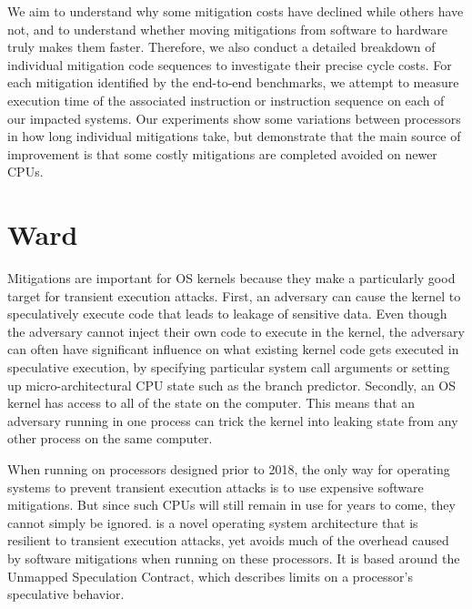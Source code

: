 We aim to understand why some mitigation costs have declined while others have not, and to understand whether moving mitigations from software to hardware truly makes them faster.
Therefore, we also conduct a detailed breakdown of individual mitigation code sequences to investigate their precise cycle costs.
For each mitigation identified by the end-to-end benchmarks, we attempt to measure execution time of the associated instruction or instruction sequence on each of our impacted systems.
Our experiments show some variations between processors in how long individual mitigations take, but demonstrate that the main source of improvement is that some costly mitigations are completed avoided on newer CPUs. 

\section{Ward}
Mitigations are important for OS kernels because they make a particularly good target for transient execution attacks.
First, an adversary can cause the kernel to speculatively execute code that
leads to leakage of sensitive data. Even though the adversary cannot
inject their own code to execute in the kernel, the adversary can often
have significant influence on what existing kernel code gets executed in
speculative execution, by specifying particular system call arguments or
setting up micro-architectural CPU state such as the branch predictor.
Secondly, an OS kernel has access to all of the state
on the computer. This means that an adversary running in one process
can trick the kernel into leaking state from any other process on the
same computer.

When running on processors designed prior to 2018, the only way for operating systems to prevent transient execution attacks is to use expensive software mitigations.
But since such CPUs will still remain in use for years to come, they cannot simply be ignored.
\sys is a novel operating system architecture that is resilient to transient execution attacks, yet avoids much of the overhead caused by software mitigations when running on these processors.
It is based around the Unmapped Speculation Contract, which describes limits on a processor's speculative behavior.

